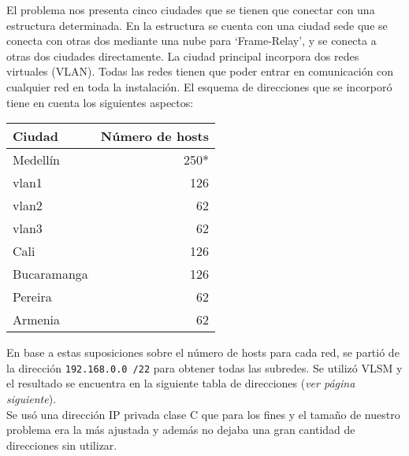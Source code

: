 El problema nos presenta cinco ciudades que se tienen que conectar con una estructura determinada. En la estructura
se cuenta con una ciudad sede que se conecta con otras dos mediante una nube para `Frame-Relay', y se conecta a otras
dos ciudades directamente. La ciudad principal incorpora dos redes virtuales (VLAN).
Todas las redes tienen que poder entrar en comunicación con cualquier red en toda la instalación.
El esquema de direcciones que se incorporó tiene en cuenta los siguientes aspectos:

\begin{center}
\begin{tabular}{ l r }
Ciudad &  Número de hosts \\ \hline
Medellín  & 250* \\
 \raggedright vlan1 & 126 \\
 vlan2 & 62 \\
  vlan3 & 62 \\
Cali  & 126 \\
Bucaramanga  & 126 \\
Pereira  & 62 \\
Armenia  & 62 \\
\end{tabular}
\end{center}


En base a estas suposiciones sobre el número de hosts para cada red, se partió de la dirección \verb=192.168.0.0 /22= para
obtener todas las subredes. Se utilizó VLSM y el resultado se encuentra en la siguiente tabla de direcciones ({\em ver página
siguiente}).\\ Se usó una dirección IP privada clase C que para los fines y el tamaño de nuestro problema era la más ajustada y además no 
dejaba una gran cantidad de direcciones sin utilizar.


